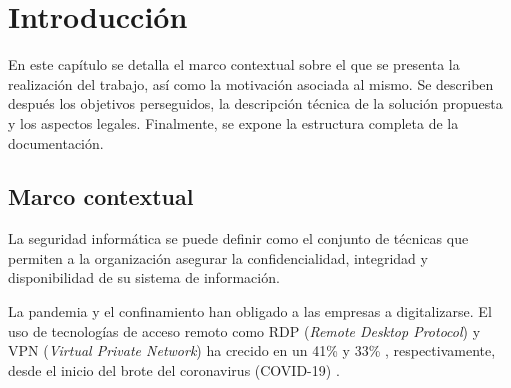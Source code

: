 

\chapter{Introducción} \label{cap:introduccion}

En este capítulo se detalla el marco contextual sobre el que se presenta la realización del trabajo, así como la motivación asociada al mismo. Se describen después los objetivos perseguidos, la descripción técnica de la solución propuesta y los aspectos legales. Finalmente, se expone la estructura completa de la documentación.\n


\section{Marco contextual} \label{sec:marcocontextual}

La seguridad informática se puede definir como el conjunto de técnicas que permiten a la organización asegurar la confidencialidad, integridad y disponibilidad de su sistema de información.\sn

La pandemia y el confinamiento han obligado a las empresas a digitalizarse. El uso de tecnologías de acceso remoto como RDP (\textit{Remote Desktop Protocol}) y VPN (\textit{Virtual Private Network}) ha crecido en un 41\% y 33\% , respectivamente, desde el inicio del brote del coronavirus (COVID-19) \cite{shodantrends}.\n

